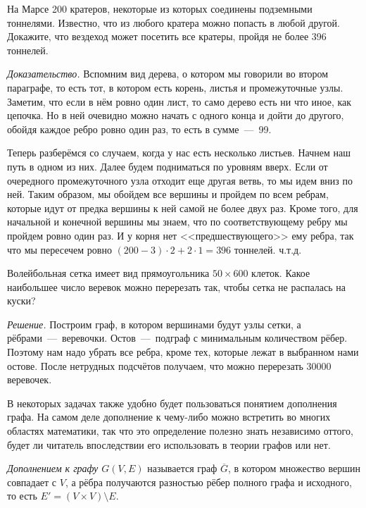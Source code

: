 \begin{example}
	На Марсе 200 кратеров, некоторые из которых соединены подземными тоннелями. Известно, что из любого кратера можно попасть в любой другой. Докажите, что вездеход может посетить все кратеры, пройдя не более 396 тоннелей.
	
	\emph{Доказательство.} Вспомним вид дерева, о котором мы говорили во втором параграфе, то есть тот, в котором есть корень, листья и промежуточные узлы. Заметим, что если в нём ровно один лист, то само дерево есть ни что иное, как цепочка. Но в ней очевидно можно начать с одного конца и дойти до другого, обойдя каждое ребро ровно один раз, то есть в сумме~---~99.
	
	Теперь разберёмся со случаем, когда у нас есть несколько листьев. Начнем наш путь в одном из них. Далее будем подниматься по уровням вверх. Если от очередного промежуточного узла отходит еще другая ветвь, то мы идем вниз по ней. Таким образом, мы обойдем все вершины и пройдем по всем ребрам, которые идут от предка вершины к ней самой не более двух раз. Кроме того, для начальной и конечной вершины мы знаем, что по соответствующему ребру мы пройдем ровно один раз. И у корня нет <<предшествующего>> ему ребра, так что мы пересечем ровно $(200 - 3) \cdot 2 + 2 \cdot 1 = 396$ тоннелей. ч.т.д.
\end{example}

\begin{example}
	Волейбольная сетка имеет вид прямоугольника $50 \times 600$ клеток. Какое наибольшее число веревок можно перерезать так, чтобы сетка не распалась на куски?
	
	\emph{Решение.} Построим граф, в котором вершинами будут узлы сетки, а рёбрами~---~веревочки. Остов~---~подграф с минимальным количеством рёбер. Поэтому нам надо убрать все ребра, кроме тех, которые лежат в выбранном нами остове. После нетрудных подсчётов получаем, что можно перерезать $30000$ веревочек.
\end{example}


 В некоторых задачах также удобно будет пользоваться понятием дополнения графа. На самом деле дополнение к чему-либо можно встретить во многих областях математики, так что это определение полезно знать независимо оттого, будет ли читатель впоследствии его использовать в теории графов или нет.
	 
\begin{definition}
	\emph{Дополнением к графу $G\left(V, E\right)$} называется граф $\overline{G}$, в котором множество вершин совпадает с $V$, а рёбра получаются разностью рёбер полного графа и исходного, то есть $E' = (V \times V )\setminus E$.
\end{definition}

